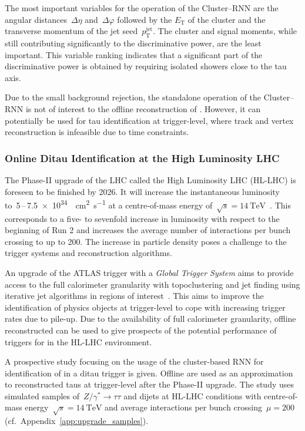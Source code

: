 The most important variables for the operation of the Cluster--RNN are the
angular distances~$\Delta \eta$ and~$\Delta \varphi$ followed by the
$E_\text{T}$ of the cluster and the transverse momentum of the jet
seed~$p_\text{T}^\text{jet}$. The cluster and signal moments, while still
contributing significantly to the discriminative power, are the least important.
This variable ranking indicates that a significant part of the discriminative
power is obtained by requiring isolated showers close to the tau axis.

Due to the small background rejection, the standalone operation of the
Cluster--RNN is not of interest to the offline reconstruction of \tauhadvis.
However, it can potentially be used for tau identification at trigger-level,
where track and vertex reconstruction is infeasible due to time constraints.

\subsubsection{Online Ditau Identification at the High Luminosity LHC}
\label{sec:hlt_rate_reduction}

The Phase-II upgrade of the LHC called the High Luminosity LHC (HL-LHC) is
foreseen to be finished by 2026. It will increase the instantaneous luminosity
to~\num{5}\,--\,\SI{7.5e34}{\per\square\centi\metre\per\second} at a
centre-of-mass energy
of~$\sqrt{s} = \SI{14}{\TeV}$~\cite{hl_lhc_prelim_design_report}. This
corresponds to a five- to sevenfold increase in luminosity with respect to the
beginning of Run 2 and increases the average number of interactions per bunch
crossing to up to \num{200}. The increase in particle density poses a challenge
to the trigger systems and reconstruction algorithms.

An upgrade of the ATLAS trigger with a \emph{Global Trigger System} aims to
provide access to the full calorimeter granularity with topoclustering and jet
finding using iterative jet algorithms in regions of
interest~\cite{phase_2_scoping}. This aims to improve the identification of
physics objects at trigger-level to cope with increasing trigger rates due to
pile-up. Due to the availability of full calorimeter granularity, offline
reconstructed \tauhadvis can be used to give prospects of the potential
performance of triggers for \tauhadvis in the HL-LHC environment.

A prospective study focusing on the usage of the cluster-based RNN for
identification of \tauhadvis in a ditau trigger is given. Offline \tauhadvis are
used as an approximation to reconstructed taus at trigger-level after the
Phase-II upgrade. The study uses simulated samples
of~$Z / \gamma^* \to \tau \tau$ and dijets at HL-LHC conditions with
centre-of-mass energy~$\sqrt{s}=\SI{14}{\TeV}$ and average interactions per
bunch crossing~$\mu = 200$ (cf.\ Appendix~\ref{app:upgrade_samples}).

